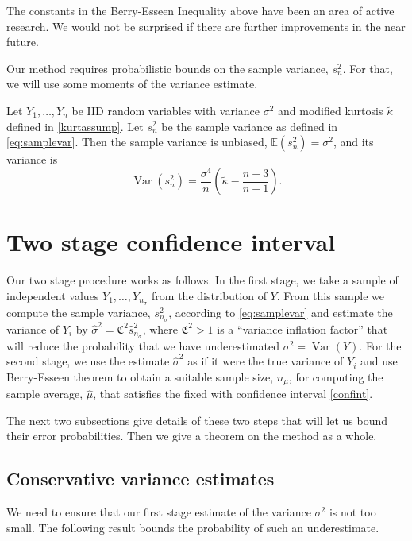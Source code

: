 \documentclass[graybox]{svmult}
\newcommand{\fudge}{\mathfrak{C}}
\newcommand\e{\mathbb{E}}
\DeclareMathOperator{\var}{Var}
\newcommand{\hmu}{\hat{\mu}}
\begin{document}
The constants in the Berry-Esseen Inequality above have been an area of active research.  We would not be surprised if there are further improvements in the near future.

Our method requires probabilistic bounds on the sample variance, $s_n^2$. For that,
we will use some moments of the variance estimate.

\begin{theorem} \cite[Eq.\ (7.16), p.\ 265]{Mil86} \label{Varvarthm} Let $Y_1, \ldots, Y_n$ be IID random variables with variance $\sigma^2$ and modified
kurtosis $\tilde \kappa$ defined in \eqref{kurtassump}.
Let  $s^2_n$ be the sample variance as defined in \eqref{eq:samplevar}.  Then the sample variance is unbiased, $\e(s^2_n)=\sigma^2$, and its variance is
\[
\var(s^2_n) = \frac{\sigma^4}{n} \left ( \tilde\kappa  - \frac{n-3}{n-1} \right).
\]
\end{theorem}

\section{Two stage confidence interval}\label{sec:twostage}

Our two stage procedure works as follows.
In the first stage, we take a sample of 
independent values $Y_1,\dots,Y_{n_\sigma}$
from the distribution of $Y$.
From this sample we compute the sample variance, 
$s^2_{n_\sigma}$, according to 
\eqref{eq:samplevar} and estimate
the variance of $Y_i$ by
$\hat\sigma^2 = \fudge^2\hat s_{n_\sigma}^2$, where
$\fudge^2>1$ is a ``variance inflation factor''
that will reduce the probability that we have
underestimated $\sigma^2=\var(Y)$.
For the second stage, we use the estimate
$\hat \sigma^2$ as if it were the true
variance of $Y_i$ and use
Berry-Esseen theorem to obtain a suitable
sample size, $n_{\mu}$, for computing the sample average, $\hmu$, that satisfies the fixed with confidence interval \eqref{confint}.

The next two subsections give details of
these two steps that will let us bound
their error probabilities. Then we give
a theorem on the method as a whole.


\subsection{Conservative variance estimates}

We need to ensure that our first stage estimate of the
variance $\sigma^2$ is not too small. The following
result bounds the probability of such an underestimate.
\end{document}
